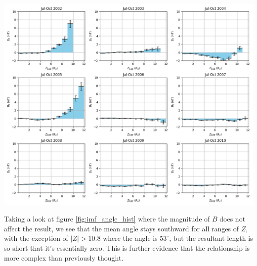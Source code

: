 \documentclass[12pt]{article}
\newenvironment{Figure}
  {\par\medskip\noindent\minipage{\linewidth}}
  {\endminipage\par\medskip}
\begin{document}
\begin{Figure}
    \centering
    \includegraphics[width=\textwidth]{indiv_months_imf_with_z.png}
    \label{fig:indiv_months_imf_with_z}
\end{Figure}

Taking a look at figure \ref{fig:imf_angle_hist} where the magnitude of $B$ does not affect the result, we see that the mean angle stays southward for all ranges of $Z$, with the exception of $|Z|>10.8$ where the angle is $53^\circ$, but the resultant length is so short that it's essentially zero. This is further evidence that the relationship is more complex than previously thought.
\end{document}
